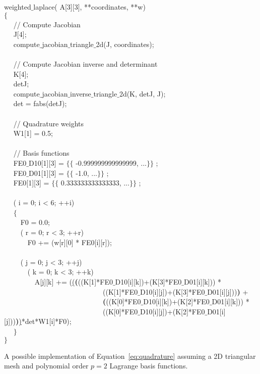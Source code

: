 \begin{algorithm}
\scriptsize
{}

 weighted$\_$laplace( A[3][3],  **coordinates,  **w) \\
$\lbrace$ \\
~~  // Compute Jacobian \\
~~   J[4]; \\
~~  compute$\_$jacobian$\_$triangle$\_$2d(J, coordinates); \\
~~\\
~~  // Compute Jacobian inverse and determinant \\
~~   K[4]; \\
~~   detJ; \\
~~  compute$\_$jacobian$\_$inverse$\_$triangle$\_$2d(K, detJ, J); \\
~~   det = fabs(detJ); \\
~~\\
~~  // Quadrature weights \\
~~   W1[1] = {0.5}; \\
~~\\
~~  // Basis functions \\
~~   FE0$\_$D10[1][3] = $\lbrace\lbrace$ -0.999999999999999, ...$\rbrace\rbrace$ ;\\
~~   FE0$\_$D01[1][3] = $\lbrace\lbrace$ -1.0, ...$\rbrace\rbrace$ ;\\
~~   FE0[1][3] = $\lbrace\lbrace$ 0.333333333333333, ...$\rbrace\rbrace$ ;\\
~~\\
~~   ( i = 0; i < 6; ++i)\\
~~  $\lbrace$\\
~~~~   F0  = 0.0;\\
~~~~   ( r  = 0; r < 3; ++r)\\
~~~~~~  F0 += (w[r][0] * FE0[i][r]);\\
~~\\
~~~~   ( j = 0; j < 3; ++j)\\
~~~~~~     ( k = 0; k < 3; ++k)\\
~~~~~~~~      A[j][k] += (\underline{(}\textbf{(}((K[1]*FE0$\_$D10[i][k])+(K[3]*FE0$\_$D01[i][k])) * \\
~~~~~~~~~~~~~~~~~~~~~~~~~~~~((K[1]*FE0$\_$D10[i][j])+(K[3]*FE0$\_$D01[i][j]))\textbf{)} + \\
~~~~~~~~~~~~~~~~~~~~~~~~~~~~\textbf{(}((K[0]*FE0$\_$D10[i][k])+(K[2]*FE0$\_$D01[i][k])) * \\
~~~~~~~~~~~~~~~~~~~~~~~~~~~~((K[0]*FE0$\_$D10[i][j])+(K[2]*FE0$\_$D01[i][j]))\textbf{)}\underline{)}*det*W1[i]*F0);\\
~~  $\rbrace$\\
$\rbrace$
\caption{A possible implementation of Equation~\ref{eq:quadrature} assuming a 2D triangular mesh and polynomial order $p=2$ Lagrange basis functions.}
\label{code:weighted-laplace}
\end{algorithm}

